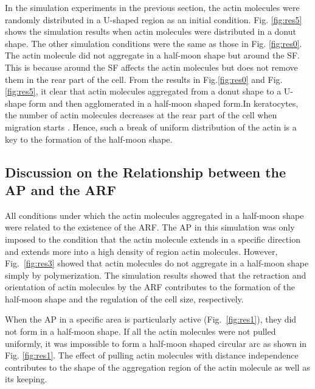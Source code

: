 \documentclass[a4paper,12pt, oneside]{book}
\begin{document}
In the simulation experiments in the previous section, the actin molecules were randomly distributed in a U-shaped region as an initial condition.
Fig. \ref{fig:res5} shows the simulation results when actin molecules were distributed in a donut shape.
The other simulation conditions were the same as those in Fig. \ref{fig:res0}.
The actin molecule did not aggregate in a half-moon shape but around the SF.
This is because around the SF affects the actin molecules but does not remove them in the rear part of the cell.
From the results in Fig.\ref{fig:res0} and Fig.\ref{fig:res5}, it clear that actin molecules aggregated from a donut shape to a U-shape form and then agglomerated in a half-moon shaped form.In keratocytes, the number of actin molecules decreases at the rear part of the cell when migration starts \cite{ridley2003cell}.
Hence, such a break of uniform distribution of the actin is a key to the formation of the half-moon shape.  

\subsection{Discussion on the Relationship between the AP and the ARF}
All conditions under which the actin molecules aggregated in a half-moon shape were related to the existence of the ARF.
The AP in this simulation was only imposed to the condition that the actin molecule extends in a specific direction and extends more into a high density of region actin molecules.
However, Fig.~\ref{fig:res3} showed that actin molecules do not aggregate in a half-moon shape simply by polymerization.
The simulation results showed that the retraction and orientation of actin molecules by the ARF contributes to the formation of the half-moon shape and the regulation of the cell size, respectively.

When the AP in a specific area is particularly active (Fig.~\ref{fig:res1}), they did not form in a half-moon shape.
If all the actin molecules were not pulled uniformly, it was impossible to form a half-moon shaped circular arc as shown in Fig. 
\ref{fig:res1}.
The effect of pulling actin molecules with distance independence contributes to the shape of the aggregation region of the actin molecule as well as its keeping.
\end{document}

